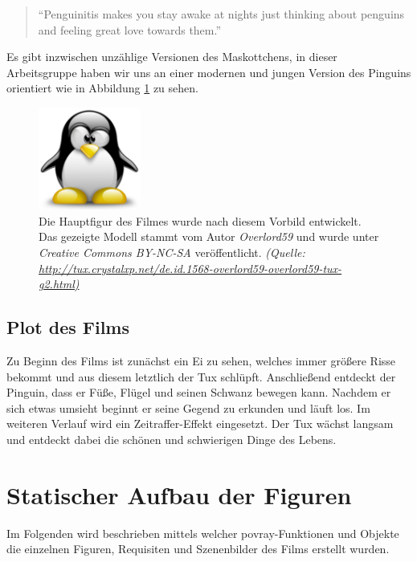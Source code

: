 \documentclass[11pt,parskip]{scrartcl}
\begin{document}
\begin{quote}
  \enquote{Penguinitis makes you stay awake at nights just thinking about
    penguins and feeling great love towards them.} \cite{tuxstory}
\end{quote}

Es gibt inzwischen unzählige Versionen des Maskottchens, in dieser
Arbeitsgruppe haben wir uns an einer modernen und jungen Version des Pinguins
orientiert wie in Abbildung \ref{fig:overlord59tux} zu sehen.

\begin{figure}[htbp]
  \centering
  \includegraphics[width=0.3\textwidth]{./fig/overlord59tux.pdf}
  \caption{
    Die Hauptfigur des Filmes wurde nach diesem Vorbild entwickelt. Das
    gezeigte Modell stammt vom Autor \emph{Overlord59} und wurde unter
    \emph{Creative Commons BY-NC-SA} veröffentlicht.
    \emph{
      (Quelle: \url{http://tux.crystalxp.net/de.id.1568-overlord59-overlord59-tux-g2.html)}
    }
  }
  \label{fig:overlord59tux}
\end{figure}


\subsection{Plot des Films}
Zu Beginn des Films ist zunächst ein Ei zu sehen, welches immer größere Risse
bekommt und aus diesem letztlich der Tux schlüpft. Anschließend entdeckt der
Pinguin, dass er Füße, Flügel und seinen Schwanz bewegen kann. Nachdem er sich
etwas umsieht beginnt er seine Gegend zu erkunden und läuft los. Im weiteren
Verlauf wird ein Zeitraffer-Effekt eingesetzt. Der Tux wächst langsam und
entdeckt dabei die schönen und schwierigen Dinge des Lebens.


\newpage

\section{Statischer Aufbau der Figuren}
Im Folgenden wird beschrieben mittels welcher povray-Funktionen und Objekte die
einzelnen Figuren, Requisiten und Szenenbilder des Films erstellt wurden.
\end{document}
